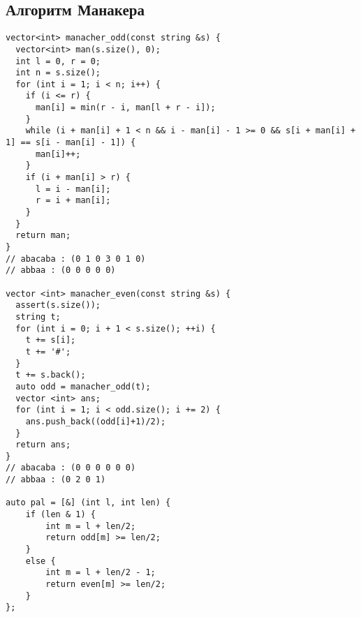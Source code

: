 \subsection{Алгоритм Манакера}
\begin{lstlisting}
vector<int> manacher_odd(const string &s) {
  vector<int> man(s.size(), 0);
  int l = 0, r = 0;
  int n = s.size();
  for (int i = 1; i < n; i++) {
    if (i <= r) {
      man[i] = min(r - i, man[l + r - i]);
    }
    while (i + man[i] + 1 < n && i - man[i] - 1 >= 0 && s[i + man[i] + 1] == s[i - man[i] - 1]) {
      man[i]++;
    }
    if (i + man[i] > r) {
      l = i - man[i];
      r = i + man[i];
    }
  }
  return man;
}
// abacaba : (0 1 0 3 0 1 0)
// abbaa : (0 0 0 0 0)

vector <int> manacher_even(const string &s) {
  assert(s.size());
  string t;
  for (int i = 0; i + 1 < s.size(); ++i) {
    t += s[i];
    t += '#';
  }
  t += s.back();
  auto odd = manacher_odd(t);
  vector <int> ans;
  for (int i = 1; i < odd.size(); i += 2) {
    ans.push_back((odd[i]+1)/2);
  }
  return ans;
}
// abacaba : (0 0 0 0 0 0)
// abbaa : (0 2 0 1)

auto pal = [&] (int l, int len) {
    if (len & 1) {
        int m = l + len/2;
        return odd[m] >= len/2;
    }
    else {
        int m = l + len/2 - 1;
        return even[m] >= len/2;
    }
};
\end{lstlisting}
